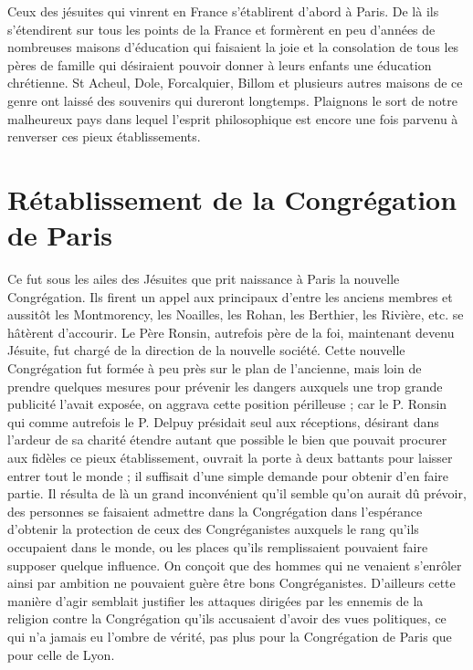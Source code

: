 Ceux des jésuites qui vinrent en France s'établirent d'abord à Paris. De là ils s'étendirent sur tous les points de la France et
formèrent en peu d'années de nombreuses maisons d'éducation qui faisaient la joie et la consolation de tous les pères de famille qui désiraient pouvoir donner à leurs enfants une éducation chrétienne. St Acheul, Dole, Forcalquier, Billom et plusieurs autres maisons de ce genre ont laissé des souvenirs qui dureront longtemps. Plaignons le sort de notre malheureux pays dans lequel l'esprit philosophique est encore une fois parvenu à renverser ces pieux établissements.

\section*{Rétablissement de la Congrégation de Paris}
Ce fut sous les ailes des Jésuites que prit naissance à Paris la nouvelle Congrégation. Ils firent un appel aux principaux d'entre les anciens membres et aussitôt les Montmorency, les Noailles, les Rohan, les Berthier, les Rivière, etc. se hâtèrent d'accourir. Le Père Ronsin, autrefois père de la foi, maintenant devenu Jésuite, fut chargé de la direction de la nouvelle société. Cette nouvelle Congrégation fut formée à peu près sur le plan de l'ancienne, mais loin de prendre quelques mesures pour prévenir les dangers auxquels une trop grande publicité l'avait exposée, on aggrava cette position périlleuse ; car le P. Ronsin qui comme autrefois le P. Delpuy présidait seul aux réceptions, désirant dans l'ardeur de sa charité étendre autant que possible le bien que pouvait procurer aux fidèles ce pieux établissement, ouvrait la porte à deux battants pour laisser entrer tout le monde ; il suffisait d'une simple demande pour obtenir d'en faire partie. Il résulta de là un grand inconvénient qu'il semble qu'on aurait dû prévoir, des personnes se faisaient admettre dans la Congrégation dans l'espérance d'obtenir la protection de ceux des Congréganistes
 auxquels le rang qu'ils occupaient dans le monde, ou les places qu'ils remplissaient pouvaient faire supposer quelque influence. On conçoit que des hommes qui ne venaient s'enrôler ainsi par ambition ne pouvaient guère être bons Congréganistes. D'ailleurs cette manière d'agir semblait justifier les attaques dirigées par les ennemis de la religion contre la Congrégation qu'ils accusaient d'avoir des vues politiques, ce qui n'a jamais eu l'ombre de vérité, pas plus pour la Congrégation de Paris que pour celle de Lyon.

